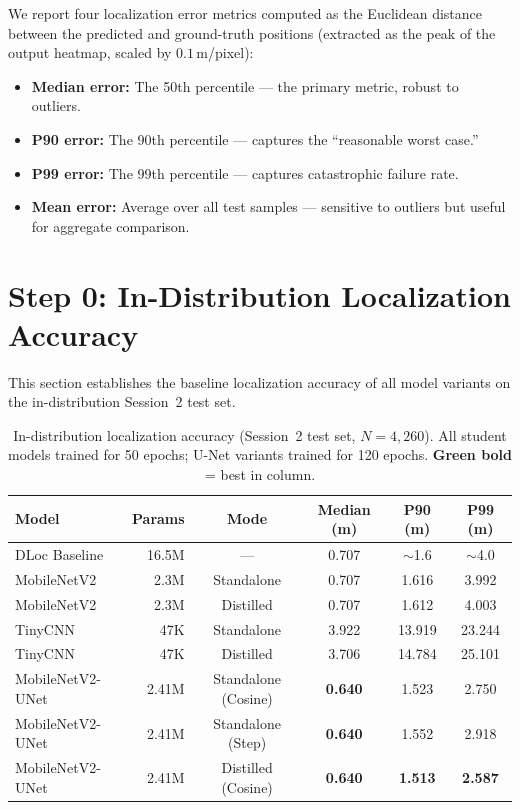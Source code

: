 \documentclass[11pt,a4paper]{article}
\newcommand{\best}[1]{\textcolor{bestcolor}{\textbf{#1}}}
\begin{document}
We report four localization error metrics computed as the Euclidean distance between the predicted and ground-truth positions (extracted as the peak of the output heatmap, scaled by $0.1$\,m/pixel):
\begin{itemize}[nosep]
  \item \textbf{Median error:} The 50th percentile --- the primary metric, robust to outliers.
  \item \textbf{P90 error:} The 90th percentile --- captures the ``reasonable worst case.''
  \item \textbf{P99 error:} The 99th percentile --- captures catastrophic failure rate.
  \item \textbf{Mean error:} Average over all test samples --- sensitive to outliers but useful for aggregate comparison.
\end{itemize}


\section{Step 0: In-Distribution Localization Accuracy}
\label{sec:step0}

This section establishes the baseline localization accuracy of all model variants on the in-distribution Session~2 test set.

\begin{table}[H]
\centering
\caption{In-distribution localization accuracy (Session~2 test set, $N = 4{,}260$). All student models trained for 50 epochs; U-Net variants trained for 120 epochs. \best{Green bold} = best in column.}
\label{tab:baseline}
\begin{tabular}{@{}lrcccc@{}}
\toprule
\textbf{Model} & \textbf{Params} & \textbf{Mode} & \textbf{Median (m)} & \textbf{P90 (m)} & \textbf{P99 (m)} \\
\midrule
DLoc Baseline         & 16.5M  & ---        & 0.707 & $\sim$1.6 & $\sim$4.0 \\
\midrule
MobileNetV2           & 2.3M   & Standalone & 0.707 & 1.616 & 3.992 \\
MobileNetV2           & 2.3M   & Distilled  & 0.707 & 1.612 & 4.003 \\
\midrule
TinyCNN               & 47K    & Standalone & 3.922 & 13.919 & 23.244 \\
TinyCNN               & 47K    & Distilled  & 3.706 & 14.784 & 25.101 \\
\midrule
MobileNetV2-UNet      & 2.41M  & Standalone (Cosine) & \best{0.640} & 1.523 & 2.750 \\
MobileNetV2-UNet      & 2.41M  & Standalone (Step)   & \best{0.640} & 1.552 & 2.918 \\
MobileNetV2-UNet      & 2.41M  & Distilled (Cosine)  & \best{0.640} & \best{1.513} & \best{2.587} \\
\bottomrule
\end{tabular}
\end{table}
\end{document}
